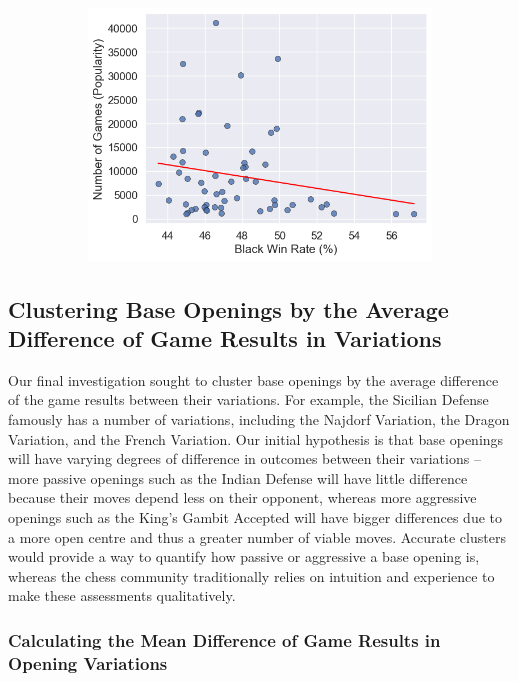 \documentclass[a4paper, 11pt]{article}
\begin{document}
\begin{figure}[H]
\begin{subfigure}{0.49\textwidth}
        \includegraphics[width=\textwidth]{Popularity of Base Opening vs. Black Win Rate (Rated 1200-).png}
    \end{subfigure}
\end{figure}

\subsection{Clustering Base Openings by the Average Difference of Game Results in Variations}
Our final investigation sought to cluster base openings by the average difference of the game results between their variations. For example, the Sicilian Defense famously has a number of variations, including the Najdorf Variation, the Dragon Variation, and the French Variation. Our initial hypothesis is that base openings will have varying degrees of difference in outcomes between their variations -- more passive openings such as the Indian Defense will have little difference because their moves depend less on their opponent, whereas more aggressive openings such as the King's Gambit Accepted will have bigger differences due to a more open centre and thus a greater number of viable moves. Accurate clusters would provide a way to quantify how passive or aggressive a base opening is, whereas the chess community traditionally relies on intuition and experience to make these assessments qualitatively.

\subsubsection{Calculating the Mean Difference of Game Results in Opening Variations}
\end{document}
